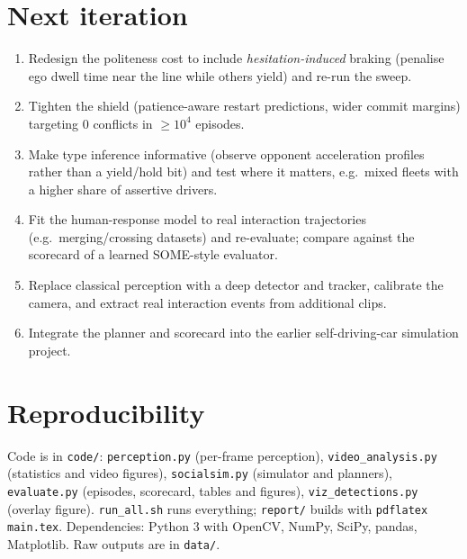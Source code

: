 \documentclass[11pt,a4paper]{article}
\begin{document}
\section{Next iteration}\label{sec:next}
\begin{enumerate}\setlength\itemsep{1pt}
\item Redesign the politeness cost to include \emph{hesitation-induced} braking (penalise ego dwell time near the line while others yield) and re-run the sweep.
\item Tighten the shield (patience-aware restart predictions, wider commit margins) targeting 0 conflicts in $\ge10^4$ episodes.
\item Make type inference informative (observe opponent acceleration profiles rather than a yield/hold bit) and test where it matters, e.g.\ mixed fleets with a higher share of assertive drivers.
\item Fit the human-response model to real interaction trajectories (e.g.\ merging/crossing datasets) and re-evaluate; compare against the scorecard of a learned SOME-style evaluator.
\item Replace classical perception with a deep detector and tracker, calibrate the camera, and extract real interaction events from additional clips.
\item Integrate the planner and scorecard into the earlier self-driving-car simulation project.
\end{enumerate}

\section{Reproducibility}
Code is in \texttt{code/}: \texttt{perception.py} (per-frame perception), \texttt{video\_analysis.py} (statistics and video figures), \texttt{socialsim.py} (simulator and planners), \texttt{evaluate.py} (episodes, scorecard, tables and figures), \texttt{viz\_detections.py} (overlay figure). \texttt{run\_all.sh} runs everything; \texttt{report/} builds with \texttt{pdflatex main.tex}. Dependencies: Python 3 with OpenCV, NumPy, SciPy, pandas, Matplotlib. Raw outputs are in \texttt{data/}.
\end{document}
